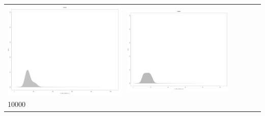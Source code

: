 \begin{table}[htbp]
{\begin{tabular}{l | ccccc}
\begin{minipage}{.15\textwidth}
     			 	\includegraphics[width=\linewidth]{images/mema-dens-graph/N11}
    				 \end{minipage}
    			   &	 \begin{minipage}{.15\textwidth}
     			 	\includegraphics[width=\linewidth]{images/mema-dens-graph/N13}
    				 \end{minipage}\\
		10000  &	 \begin{minipage}{.15\textwidth}

\end{minipage}
\end{tabular}}
\end{table}
